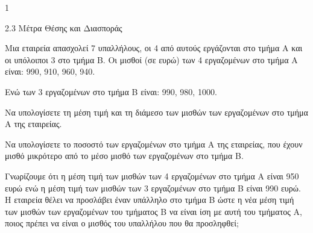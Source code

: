 \begin{ylh}{1}
    \item 2.3 Μέτρα Θέσης και Διασποράς
\end{ylh}
Μια εταιρεία απασχολεί 7 υπαλλήλους, οι 4 από αυτούς εργάζονται στο τμήμα Α και οι υπόλοιποι 3 στο τμήμα Β. Οι μισθοί (σε ευρώ) των 4 εργαζομένων στο τμήμα Α είναι: 990, 910, 960, 940.

Ενώ των 3 εργαζομένων στο τμήμα Β είναι: 990, 980, 1000.
\begin{alist}
    \item Να υπολογίσετε τη μέση τιμή και τη διάμεσο των μισθών των εργαζομένων στο τμήμα Α της εταιρείας. 
    \item Να υπολογίσετε το ποσοστό των εργαζομένων στο τμήμα Α της εταιρείας, που έχουν μισθό μικρότερο από το μέσο μισθό των εργαζομένων στο τμήμα Β. 
    \item Γνωρίζουμε ότι η μέση τιμή των μισθών των 4 εργαζομένων στο τμήμα Α είναι 950 ευρώ ενώ η μέση τιμή των μισθών των 3 εργαζομένων στο τμήμα Β είναι 990 ευρώ. Η εταιρεία θέλει να προσλάβει έναν υπάλληλο στο τμήμα Β ώστε η νέα μέση τιμή των μισθών των εργαζομένων του τμήματος Β να είναι ίση με αυτή του τμήματος Α, ποιος πρέπει να είναι ο μισθός του υπαλλήλου που θα προσληφθεί; 
\end{alist}

